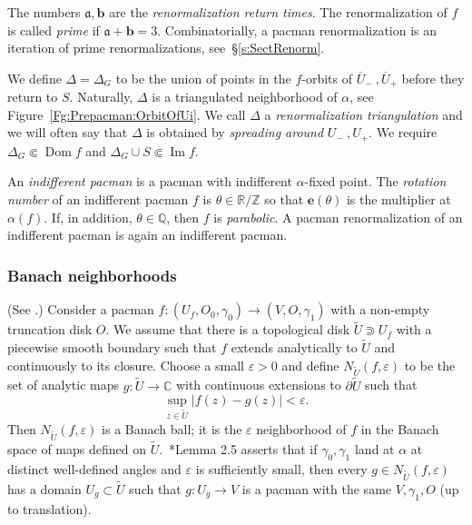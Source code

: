 \documentclass{amsart}
\newcommand{\Dom}{\operatorname {Dom}}
\newcommand{\1}{{\mathbb 1 }}
\renewcommand{\Im}{\operatorname {Im}}
\newcommand{\bDelta}{{\mathbb{\Delta}}}
\newcommand{\ee}{\mathbf e}
\renewcommand{\aa}{\mathfrak{a}}
\newcommand{\bb}{{\mathbf b}}
\newcommand{\C}{\mathbb{C}}
\newcommand{\Q}{\mathbb{Q}}
\newcommand{\R}{\mathbb{R}}
\newcommand{\Z}{\mathbb{Z}}
\theoremstyle{remark}
\numberwithin{equation}{section}
\theoremstyle{definition}
\theoremstyle{nonumberbreak}
\begin{document}
The numbers $\aa,\bb$ are the \emph{renormalization return times}. The renormalization of $f$ is called \emph{prime} if $\aa+\bb=3$. Combinatorially, a pacman renormalization is an iteration of prime
renormalizations, see~\S\ref{s:SectRenorm}.

We define $\bDelta=\bDelta_G$ to be the union of points in the $f$-orbits of $\overline U_-~,\overline U_+$ before they return to $S$. Naturally, $\bDelta$ is a triangulated neighborhood of $\alpha$, see Figure~\ref{Fg:Prepacman:OrbitOfUi}. We call $\bDelta$ a \emph{renormalization triangulation} and we will often say that $\bDelta$ is obtained by \emph{spreading around} $U_-~,U_+$. We require $\bDelta_G\Subset \Dom f$ and $\bDelta_G\cup S\Subset \Im f$.

An \emph{indifferent pacman} is a pacman with indifferent $\alpha$-fixed point. The \emph{rotation number} of an indifferent pacman $f$ is $\theta \in \R/\Z$ so that $\ee(\theta)$ is the multiplier at $\alpha(f)$. If, in addition, $\theta\in \Q$, then $f$ is \emph{parabolic}. A pacman renormalization of an indifferent pacman is again an indifferent pacman.


\subsubsection{Banach neighborhoods} (See \cite[\S 2.4]{DLS}.)
Consider a pacman $f:(U_f,O_0,\gamma_0)\to (V,O,\gamma_1)$ with a non-empty truncation disk $O$. We assume that there is a topological disk $\widetilde U\Supset U_f$ with a piecewise smooth boundary such that $f$ extends analytically to $\widetilde U$ and continuously to its closure.
Choose a small $\varepsilon>0$ and define $N_{\widetilde U}(f, \varepsilon)$ to be the set of analytic maps $g:\widetilde U\to \C$ with continuous extensions to $\partial \widetilde U$ such that
\[\sup_{z\in \widetilde U} |f(z)-g(z)| < \varepsilon.\]
Then $N_{\widetilde U}(f,\varepsilon)$ is a Banach ball; it is the $\varepsilon$ neighborhood of $f$ in the Banach space of maps defined on $\widetilde U$.~\cite{DLS}*{Lemma 2.5} asserts that if $\gamma_0,\gamma_1$ land at $\alpha$ at distinct well-defined angles and $\varepsilon$ is sufficiently small, then every $g\in N_{\widetilde U}(f,\varepsilon)$ has a domain $U_g\subset \widetilde U$ such that $g\colon U_g\to V$ is a pacman with the same $V,\gamma_1,O$ (up to translation).



  
\end{document}
